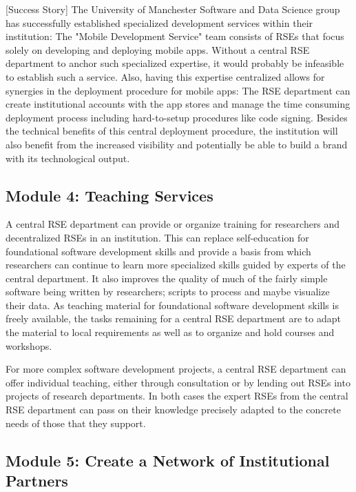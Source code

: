 \documentclass[a4paper]{article}
\begin{document}
[Success Story]
The University of Manchester Software and Data Science group has successfully established specialized development services within their institution:
The "Mobile Development Service" \autocite{manchester_mobile} team consists of RSEs that focus solely on developing and deploying mobile apps.
Without a central RSE department to anchor such specialized expertise, it would probably be infeasible to establish such a service.
Also, having this expertise centralized allows for synergies in the deployment procedure for mobile apps:
The RSE department can create institutional accounts with the app stores and manage the time consuming deployment process including hard-to-setup procedures like code signing.
Besides the technical benefits of this central deployment procedure, the institution will also benefit from the increased visibility and potentially be able to build a brand with its technological output.

\subsection{Module 4: Teaching Services}
\label{sec:teaching}

A central RSE department can provide or organize training for researchers and decentralized RSEs in an institution.
This can replace self-education for foundational software development skills and provide a basis from which researchers can continue to learn more specialized skills guided by experts of the central department.
It also improves the quality of much of the fairly simple software being written by researchers; scripts to process and maybe visualize their data.
As teaching material for foundational software development skills is freely available,
the tasks remaining for a central RSE department are to adapt the material to local requirements as well as to organize and hold courses and workshops.

For more complex software development projects, a central RSE department can offer individual teaching, either through consultation or by lending out RSEs into projects of research departments.
In both cases the expert RSEs from the central RSE department can pass on their knowledge precisely adapted to the concrete needs of those that they support.

\subsection{Module 5: Create a Network of Institutional Partners}
\label{sec:partners}
\end{document}
